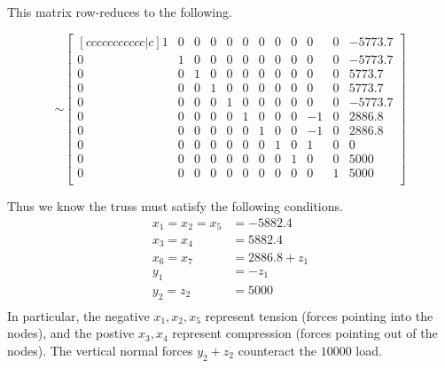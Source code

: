 \begin{observation}
This matrix row-reduces to the following.


\[\sim
\begin{bmatrix}[ccccccccccc|c]
1&0&0&0&0&0&0&0&0&0&0&-5773.7\\
0&1&0&0&0&0&0&0&0&0&0&-5773.7\\
0&0&1&0&0&0&0&0&0&0&0&5773.7\\
0&0&0&1&0&0&0&0&0&0&0&5773.7\\
0&0&0&0&1&0&0&0&0&0&0&-5773.7\\
0&0&0&0&0&1&0&0&0&-1&0&2886.8\\
0&0&0&0&0&0&1&0&0&-1&0&2886.8\\
0&0&0&0&0&0&0&1&0&1&0&0\\
0&0&0&0&0&0&0&0&1&0&0&5000\\
0&0&0&0&0&0&0&0&0&0&1&5000\\
\end{bmatrix}
\]
\end{observation}
\begin{observation}
\drawtruss{\trussCompletion}

Thus we know the truss must satisfy the following conditions.
\begin{align*}
x_1=x_2=x_5&=-5882.4 \\
x_3=x_4&=5882.4\\
x_6=x_7&=2886.8+z_1\\
y_1&=-z_1\\
y_2=z_2&=5000 \\
\end{align*}
In particular, the negative \(x_1,x_2,x_5\) represent tension (forces pointing into the nodes),
and the postive \(x_3,x_4\) represent compression (forces pointing out of the nodes).
The vertical normal forces \(y_2+z_2\) counteract the \(10000\) load.

\end{observation}


